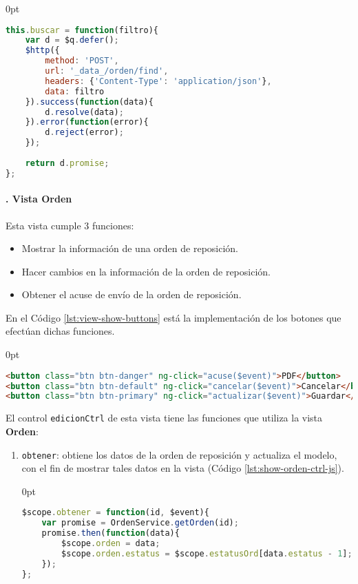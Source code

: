 \begin{enumerate}
\pagebreak

\begin{adjustwidth}{\listingfixwidth}{0pt}
\begin{lstlisting}[language=Javascript, caption={Servicio de \textit{AngularJS} para buscar órdenes de reposición.}, captionpos=b, label={lst:search-service-js}]
this.buscar = function(filtro){
	var d = $q.defer();
	$http({
		method: 'POST',
		url: '_data_/orden/find',
		headers: {'Content-Type': 'application/json'},
		data: filtro
	}).success(function(data){
		d.resolve(data);
	}).error(function(error){
		d.reject(error);
	});
	
	return d.promise;
};
\end{lstlisting}
\end{adjustwidth}

\paragraph{. Vista Orden\\}
Esta vista cumple 3 funciones:
\begin{itemize}
	\item Mostrar la información de una orden de reposición.
	\item Hacer cambios en la información de la orden de reposición.
	\item Obtener el acuse de envío de la orden de reposición.
\end{itemize}
En el Código \ref{lst:view-show-buttons} está la implementación de los botones que efectúan dichas funciones. 
\begin{adjustwidth}{\listingfixwidth}{0pt}
\begin{lstlisting}[language=HTML, captionpos=b, caption={Controles de la vista de orden de reposición.}, label={lst:view-show-buttons}]
<button class="btn btn-danger" ng-click="acuse($event)">PDF</button>
<button class="btn btn-default" ng-click="cancelar($event)">Cancelar</button>
<button class="btn btn-primary" ng-click="actualizar($event)">Guardar</button>
\end{lstlisting}
\end{adjustwidth}

El control \texttt{edicionCtrl} de esta vista tiene las funciones que utiliza la vista \textbf{Orden}:
\begin{enumerate}
	\item \texttt{obtener}: obtiene los datos de la orden de reposición y actualiza el modelo, con el fin de mostrar tales datos en la vista (Código \ref{lst:show-orden-ctrl-js}).
\begin{adjustwidth}{\listingfixlargewidth}{0pt}
\begin{lstlisting}[language=Javascript, caption={Función del controlador para llenar los datos de la vista de orden de reposición.}, captionpos=b, label={lst:show-orden-ctrl-js}]
$scope.obtener = function(id, $event){
	var promise = OrdenService.getOrden(id);
	promise.then(function(data){
		$scope.orden = data;
		$scope.orden.estatus = $scope.estatusOrd[data.estatus - 1];
	});
};
\end{lstlisting}
\end{adjustwidth}


\end{enumerate}
\end{enumerate}
